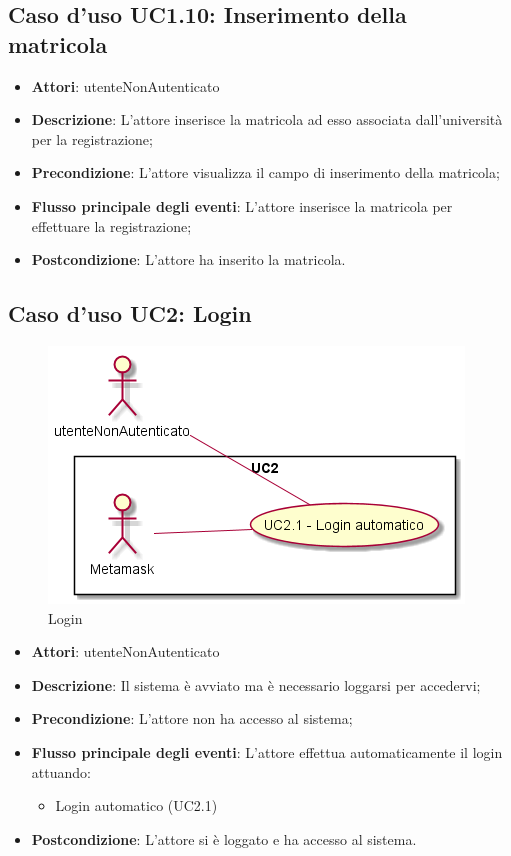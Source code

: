 \subsection{Caso d'uso \texorpdfstring{UC1.10}{UC1.10}: Inserimento della matricola}
\begin{itemize}
\item \textbf{Attori}: utenteNonAutenticato
\item \textbf{Descrizione}: L'attore inserisce la matricola ad esso associata dall'università per la registrazione;
\item \textbf{Precondizione}: L'attore visualizza il campo di inserimento della matricola;
\item \textbf{Flusso principale degli eventi}: L'attore inserisce la matricola per effettuare la registrazione;
\item \textbf{Postcondizione}: L'attore ha inserito la matricola.
\end{itemize}
\subsection{Caso d'uso \texorpdfstring{UC2}{UC2}: Login}
\begin{figure} [H]
\centering
\includegraphics[scale=0.45]{./img/UC2.png}
\caption{Login}\label{}
\end{figure}
\begin{itemize}
\item \textbf{Attori}: utenteNonAutenticato
\item \textbf{Descrizione}: Il sistema è avviato ma è necessario loggarsi per accedervi;
\item \textbf{Precondizione}: L'attore non ha accesso al sistema;
\item \textbf{Flusso principale degli eventi}: L'attore effettua automaticamente il login attuando:
\begin{itemize}
\item Login automatico (UC2.1)
\end{itemize}
\item \textbf{Postcondizione}: L'attore si è loggato e ha accesso al sistema.
\end{itemize}
